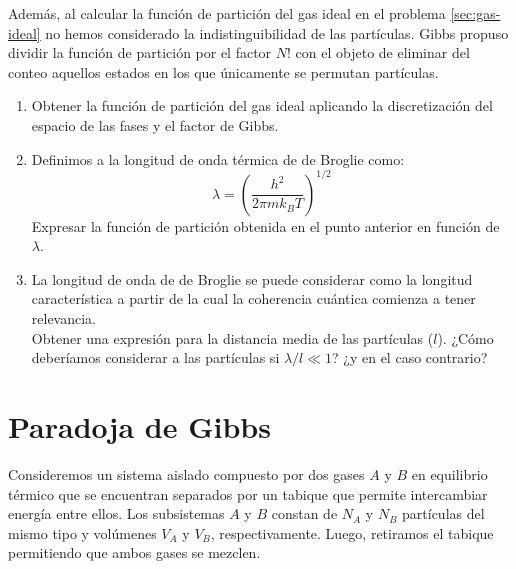 \documentclass[a4paper,11pt]{article}
\begin{document}
Además, al calcular la función de partición del gas ideal en el problema
\ref{sec:gas-ideal} no hemos considerado la indistinguibilidad de las partículas.
Gibbs propuso dividir la función de partición por el factor $N!$ con el objeto de
eliminar del conteo aquellos estados en los que únicamente se permutan partículas.

\begin{enumerate}[label=(\alph*),
                  leftmargin=2\parindent,
                  rightmargin=2\parindent]

    \item{\label{item:de-broglie-particion}
          Obtener la función de partición del gas ideal aplicando la discretización del
          espacio de las fases y el factor de Gibbs.
          }

    \item{Definimos a la longitud de onda térmica de de Broglie como:
          $$ \lambda = \left( \frac{h^2}{2\pi m k_B T} \right)^{1/2} $$
          Expresar la función de partición obtenida en el punto
          anterior en función de $\lambda$.
          }

    \item{La longitud de onda de de Broglie se puede considerar como la
          longitud característica a partir de la cual la coherencia
          cuántica comienza a tener relevancia.\\
          Obtener una expresión para la distancia media de las
          partículas ($l$). ¿Cómo deberíamos considerar a las
          partículas si $\lambda/l \ll 1$? ¿y en el caso contrario?
          }

\end{enumerate}


\section{Paradoja de Gibbs}

Consideremos un sistema aislado compuesto por dos gases $A$ y $B$ en
equilibrio térmico que se encuentran separados por un tabique que
permite intercambiar energía entre ellos.
Los subsistemas $A$ y $B$ constan de $N_A$ y $N_B$ partículas del mismo
tipo y volúmenes $V_A$ y $V_B$, respectivamente.
Luego, retiramos el tabique permitiendo que ambos gases se mezclen.
\end{document}
